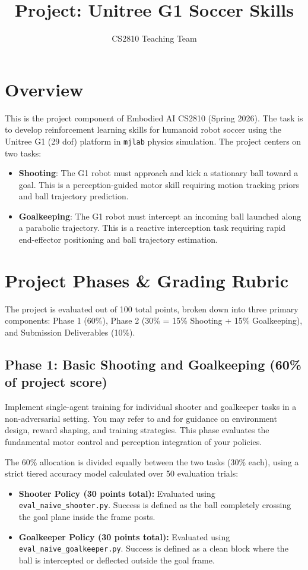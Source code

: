\documentclass{article}
\title{Project: Unitree G1 Soccer Skills}
\author{CS2810 Teaching Team}
\begin{document}
\maketitle

\section{Overview}

This is the project component of Embodied AI CS2810 (Spring 2026). The task is to develop reinforcement learning skills for humanoid robot soccer using the Unitree G1 (29 dof) platform in \texttt{mjlab} physics simulation. The project centers on two tasks:

\begin{itemize}
  \item \textbf{Shooting}: The G1 robot must approach and kick a stationary ball toward a goal. This is a perception-guided motor skill requiring motion tracking priors and ball trajectory prediction.
  \item \textbf{Goalkeeping}: The G1 robot must intercept an incoming ball launched along a parabolic trajectory. This is a reactive interception task requiring rapid end-effector positioning and ball trajectory estimation.
\end{itemize}

\section{Project Phases \& Grading Rubric}
The project is evaluated out of 100 total points, broken down into three primary components: Phase 1 (60\%), Phase 2 (30\% = 15\% Shooting + 15\% Goalkeeping), and Submission Deliverables (10\%).

\subsection{Phase 1: Basic Shooting and Goalkeeping (60\% of project score)}
Implement single-agent training for individual shooter and goalkeeper tasks in a non-adversarial setting. You may refer to \cite{kong2026learningsoccerskillshumanoid} and \cite{ren2025humanoidgoalkeeper} for guidance on environment design, reward shaping, and training strategies. This phase evaluates the fundamental motor control and perception integration of your policies.

The 60\% allocation is divided equally between the two tasks (30\% each), using a strict tiered accuracy model calculated over 50 evaluation trials:
\begin{itemize}
    \item \textbf{Shooter Policy (30 points total):} Evaluated using \texttt{eval\_naive\_shooter.py}. Success is defined as the ball completely crossing the goal plane inside the frame posts.
    \item \textbf{Goalkeeper Policy (30 points total):} Evaluated using \texttt{eval\_naive\_goalkeeper.py}. Success is defined as a clean block where the ball is intercepted or deflected outside the goal frame.
\end{itemize}
\end{document}
